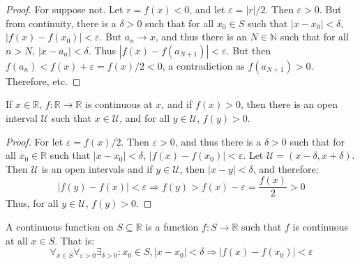 \documentclass[crop=false,class=book,oneside]{standalone}
\begin{document}
            \begin{proof}
                For suppose not. Let $r=f(x)<0$, and let
                $\varepsilon=|r|/2$. Then $\varepsilon>0$. But
                from continuity, there is a $\delta>0$ such that
                for all $x_{0}\in{S}$ such that $|x-x_{0}|<\delta$,
                $|f(x)-f(x_{0})|<\varepsilon$. But
                $a_{n}\rightarrow{x}$, and thus there is an
                $N\in\mathbb{N}$ such that for all $n>N$,
                $|x-a_{n}|<\delta$. Thus
                $|f(x)-f(a_{N+1})|<\varepsilon$. But then
                $f(a_{n})<f(x)+\varepsilon=f(x)/2<0$,
                a contradiction as $f(a_{N+1})>0$. Therefore, etc.
            \end{proof}
            \begin{theorem}
                If $x\in\mathbb{R}$,
                $f:\mathbb{R}\rightarrow\mathbb{R}$ is
                continuous at $x$, and if $f(x)>0$,
                then there is an open interval
                $\mathcal{U}$ such that $x\in\mathcal{U}$,
                and for all $y\in\mathcal{U}$, $f(y)>0$.
            \end{theorem}
            \begin{proof}
                For let $\varepsilon=f(x)/2$. Then
                $\varepsilon>0$, and thus there is a $\delta>0$
                such that for all $x_{0}\in\mathbb{R}$
                such that $|x-x_{0}|<\delta$,
                $|f(x)-f(x_{0})|<\varepsilon$. Let
                $\mathcal{U}=(x-\delta,x+\delta)$.
                Then $\mathcal{U}$ is an open intervals and if
                $y\in\mathcal{U}$, then $|x-y|<\delta$,
                and therefore:
                \begin{equation}
                    |f(y)-f(x)|<\varepsilon
                    \Rightarrow
                    f(y)>f(x)-\varepsilon
                    =\frac{f(x)}{2}>0
                \end{equation}
                Thus, for all $y\in\mathcal{U}$, $f(y)>0$.
            \end{proof}
            \begin{definition}
                A continuous function on
                $S\subseteq\mathbb{R}$ is a function
                $f:S\rightarrow\mathbb{R}$ such that
                $f$ is continuous at all $x\in{S}$. That is:
                \begin{equation}
                    \forall_{x\in{S}}\forall_{\varepsilon>0}
                    \exists_{\delta>0}:x_{0}\in{S},
                    |x-x_{0}|<\delta
                    \Rightarrow|f(x)-f(x_{0})|<\varepsilon
                \end{equation}
            \end{definition}
\end{document}
